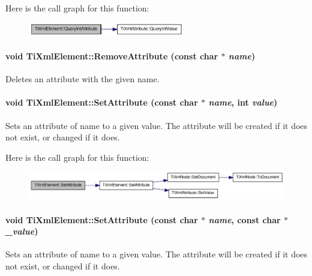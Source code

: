 Here is the call graph for this function:\nopagebreak
\begin{figure}[H]
\begin{center}
\leavevmode
\includegraphics[width=192pt]{class_ti_xml_element_aea0bfe471380f281c5945770ddbf52b9_cgraph}
\end{center}
\end{figure}
\hypertarget{class_ti_xml_element_a56979767deca794376b1dfa69a525b2a}{
\paragraph[{RemoveAttribute}]{\setlength{\rightskip}{0pt plus 5cm}void TiXmlElement::RemoveAttribute (const char $\ast$ {\em name})}\hfill}
\label{class_ti_xml_element_a56979767deca794376b1dfa69a525b2a}
Deletes an attribute with the given name. \hypertarget{class_ti_xml_element_ace6f4be75e373726d4774073d666d1a7}{
\paragraph[{SetAttribute}]{\setlength{\rightskip}{0pt plus 5cm}void TiXmlElement::SetAttribute (const char $\ast$ {\em name}, \/  int {\em value})}\hfill}
\label{class_ti_xml_element_ace6f4be75e373726d4774073d666d1a7}
Sets an attribute of name to a given value. The attribute will be created if it does not exist, or changed if it does. 

Here is the call graph for this function:\nopagebreak
\begin{figure}[H]
\begin{center}
\leavevmode
\includegraphics[width=339pt]{class_ti_xml_element_ace6f4be75e373726d4774073d666d1a7_cgraph}
\end{center}
\end{figure}
\hypertarget{class_ti_xml_element_abf0b3bd7f0e4c746a89ec6e7f101fc32}{
\paragraph[{SetAttribute}]{\setlength{\rightskip}{0pt plus 5cm}void TiXmlElement::SetAttribute (const char $\ast$ {\em name}, \/  const char $\ast$ {\em \_\-value})}\hfill}
\label{class_ti_xml_element_abf0b3bd7f0e4c746a89ec6e7f101fc32}
Sets an attribute of name to a given value. The attribute will be created if it does not exist, or changed if it does. 

